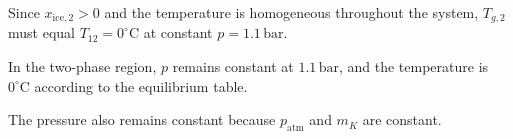 Since \( x_{\text{ice},2} > 0 \) and the temperature is homogeneous throughout the system, \( T_{g,2} \) must equal \( T_{12} = 0^\circ\text{C} \) at constant \( p = 1.1 \, \text{bar} \).  

In the two-phase region, \( p \) remains constant at \( 1.1 \, \text{bar} \), and the temperature is \( 0^\circ\text{C} \) according to the equilibrium table.  

The pressure also remains constant because \( p_{\text{atm}} \) and \( m_K \) are constant.